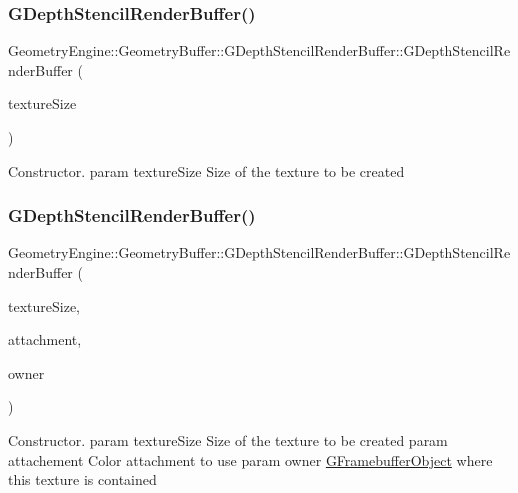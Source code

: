 \subsubsection{\texorpdfstring{GDepthStencilRenderBuffer()}{GDepthStencilRenderBuffer()}\hspace{0.1cm}{\footnotesize\ttfamily [1/3]}}
{\footnotesize\ttfamily Geometry\+Engine\+::\+Geometry\+Buffer\+::\+G\+Depth\+Stencil\+Render\+Buffer\+::\+G\+Depth\+Stencil\+Render\+Buffer (\begin{DoxyParamCaption}\item[{const Q\+Vector2D \&}]{texture\+Size }\end{DoxyParamCaption})}

Constructor. param texture\+Size Size of the texture to be created \mbox{\label{class_geometry_engine_1_1_geometry_buffer_1_1_g_depth_stencil_render_buffer_a27a3fc8842773b19247feb6fd25c32bd}} 
\subsubsection{\texorpdfstring{GDepthStencilRenderBuffer()}{GDepthStencilRenderBuffer()}\hspace{0.1cm}{\footnotesize\ttfamily [2/3]}}
{\footnotesize\ttfamily Geometry\+Engine\+::\+Geometry\+Buffer\+::\+G\+Depth\+Stencil\+Render\+Buffer\+::\+G\+Depth\+Stencil\+Render\+Buffer (\begin{DoxyParamCaption}\item[{const Q\+Vector2D \&}]{texture\+Size,  }\item[{G\+Framebuffer\+Commons\+::\+G\+\_\+\+D\+E\+P\+T\+H\+\_\+\+S\+T\+E\+N\+C\+I\+L\+\_\+\+A\+T\+T\+A\+C\+H\+M\+E\+N\+TS}]{attachment,  }\item[{const \mbox{\hyperlink{class_geometry_engine_1_1_geometry_buffer_1_1_g_framebuffer_object}{G\+Framebuffer\+Object}} $\ast$}]{owner }\end{DoxyParamCaption})}

Constructor. param texture\+Size Size of the texture to be created param attachement Color attachment to use param owner \mbox{\hyperlink{class_geometry_engine_1_1_geometry_buffer_1_1_g_framebuffer_object}{G\+Framebuffer\+Object}} where this texture is contained \mbox{\label{class_geometry_engine_1_1_geometry_buffer_1_1_g_depth_stencil_render_buffer_a59656d1f372a0f2d3998c21202780e3c}} 

